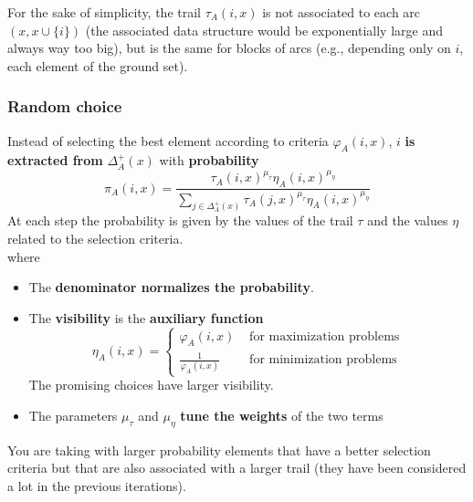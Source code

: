 \documentclass[11pt]{article}
\begin{document}
	For the sake of simplicity, the trail $\tau_A (i, x)$ is not associated to each arc $(x, x \cup \{i\})$ (the associated data structure would be exponentially large and always way too big), but is the same for blocks of arcs (e.g., depending only on $i$, each element of the ground set).\\
	
	\newpage
	
	\subsubsection{Random choice}
	Instead of selecting the best element according to criteria $\varphi_A (i, x)$, $i$ \textbf{is extracted from} $\Delta_A^+ (x)$ with \textbf{probability}
	$$ \pi_A (i,x) = \frac{ \tau_A (i, x)^{\mu_{\tau}} \eta_A (i, x)^{\mu_{\eta} } }{ \sum_{j \in \Delta_A^+ (x)} \tau_A (j, x)^{\mu_{\tau} } \eta_A (i,x)^{\mu_{\eta} } } $$
	At each step the probability is given by the values of the trail $\tau$ and the values $\eta$ related to the selection criteria.\\

	where
	\begin{itemize}
		\item The \textbf{denominator normalizes the probability}.\\
		
		\item The \textbf{visibility} is the \textbf{auxiliary function}
		$$ \eta_A (i,x ) =  
		\begin{cases}
			\varphi_A (i, x) & \text{ for maximization problems} \\
			\frac{1}{\varphi_A (i, x)} & \text{ for minimization problems}
		\end{cases}
		$$
		The promising choices have larger visibility.\\
		
		\item The parameters $\mu_{\tau}$ and $\mu_{\eta}$ \textbf{tune the weights} of the two terms
	\end{itemize}
	
	You are taking with larger probability elements that have a better selection criteria but that are also associated with a larger trail (they have been considered a lot in the previous iterations).\\
	
	\newpage
	
\end{document}
